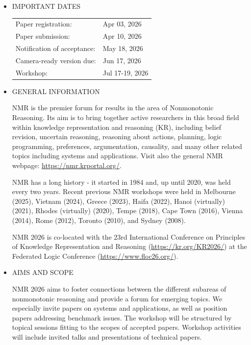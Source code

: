 \documentclass[prodmode,acmtecs]{acmsmall} %
\begin{document}
\begin{itemize}\item  IMPORTANT DATES 
 
\begin{tabulary}{\linewidth}{LL}Paper registration:  & Apr 03, 2026 \\
Paper submission:  & Apr 10, 2026 \\
Notification of acceptance:  & May 18, 2026 \\
Camera-ready version due:  & Jun 17, 2026 \\
Workshop:  & Jul 17-19, 2026 \\
\end{tabulary}
 
\item  GENERAL INFORMATION 
 
  NMR is the premier forum for results in the area of Nonmonotonic Reasoning. Its aim is to bring together active researchers in this broad field within knowledge representation and reasoning (KR), including belief revision, uncertain reasoning, reasoning about actions, planning, logic programming, preferences, argumentation, causality, and many other related topics including systems and applications. Visit also the general NMR webpage: \href{https://nmr.krportal.org/}{https://nmr.krportal.org/}. 
 
  NMR has a long history - it started in 1984 and, up until 2020, was held every two years. Recent previous NMR workshops were held in Melbourne (2025), Vietnam (2024), Greece (2023), Haifa (2022), Hanoi (virtually) (2021), Rhodes (virtually) (2020), Tempe (2018), Cape Town (2016), Vienna (2014), Rome (2012), Toronto (2010), and Sydney (2008). 
 
  NMR 2026 is co-located with the 23rd International Conference on Principles of Knowledge Representation and Reasoning (\href{https://kr.org/KR2026/}{https://kr.org/KR2026/}) at the Federated Logic Conference (\href{https://www.floc26.org/}{https://www.floc26.org/}). 
 
\item  AIMS AND SCOPE 
 
  NMR 2026 aims to foster connections between the different subareas of nonmonotonic reasoning and provide a forum for emerging topics. We especially invite papers on systems and applications, as well as position papers addressing benchmark issues. The workshop will be structured by topical sessions fitting to the scopes of accepted papers. Workshop activities will include invited talks and presentations of technical papers. 
 

\end{itemize}
\end{document}
